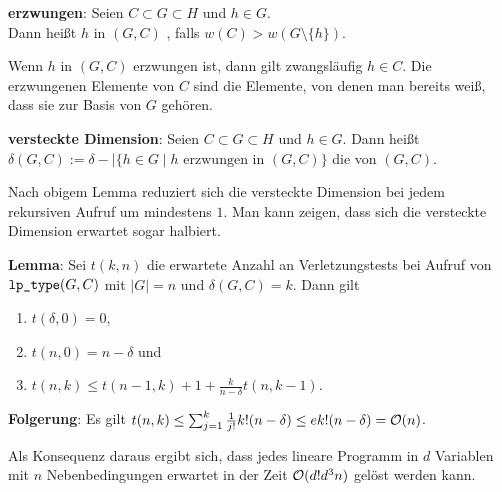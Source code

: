 \textbf{erzwungen}:
Seien $C \subset G \subset H$ und $h \in G$.\\
Dann heißt $h$ in $(G, C)$ , falls $w(C) > w(G \setminus \{h\})$.

Wenn $h$ in $(G, C)$ erzwungen ist, dann gilt zwangsläufig $h \in C$.
Die erzwungenen Elemente von $C$ sind die Elemente, von denen man bereits weiß, dass sie zur
Basis von $G$ gehören.

\textbf{versteckte Dimension}:
Seien $C \subset G \subset H$ und $h \in G$.
Dann heißt\\
$\delta(G, C) := \delta - |\{h \in G \;|\; \text{$h$ erzwungen in $(G, C)$}\}$
die  von $(G, C)$.

Nach obigem Lemma reduziert sich die versteckte Dimension bei jedem rekursiven Aufruf um
mindestens $1$.
Man kann zeigen, dass sich die versteckte Dimension erwartet sogar halbiert.

\linie

\textbf{Lemma}:
Sei $t(k, n)$ die erwartete Anzahl an Verletzungstests bei Aufruf von $\texttt{lp\_type}(G, C)$ mit
$|G| = n$ und $\delta(G, C) = k$.
Dann gilt
\begin{enumerate}
    \item
    $t(\delta, 0) = 0$,
    
    \item
    $t(n, 0) = n - \delta$ und
    
    \item
    $t(n, k) \le t(n - 1, k) + 1 + \frac{k}{n - \delta} t(n, k - 1)$.
\end{enumerate}

\textbf{Folgerung}:
Es gilt $t(n, k) \le \sum_{j=1}^k \frac{1}{j!} k! (n - \delta) \le e k! (n - \delta) = \mathcal{O}(n)$.

Als Konsequenz daraus ergibt sich, dass jedes lineare Programm in $d$ Variablen mit $n$
Nebenbedingungen erwartet in der Zeit $\mathcal{O}(d! d^3 n)$ gelöst werden kann.

\pagebreak
